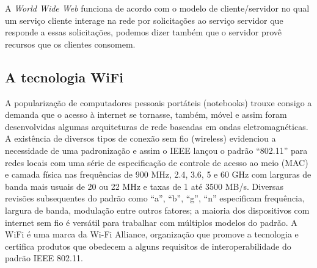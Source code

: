 A \textit{World Wide Web} funciona de acordo com o modelo de cliente/servidor no qual um serviço cliente interage na rede por solicitações ao serviço servidor que responde a essas solicitações, podemos dizer também que o servidor provê recursos que os clientes consomem.

\subsection{A tecnologia \ac{WiFi}}

A popularização de computadores pessoais portáteis (notebooks) trouxe consigo a demanda que o acesso à internet se tornasse, também, móvel e assim foram desenvolvidas algumas arquiteturas de rede baseadas em ondas eletromagnéticas. A existência de diversos tipos de conexão sem fio (wireless) evidenciou a necessidade de uma padronização e assim o \ac{IEEE} lançou o padrão “802.11” para redes locais \cite{wifi} com uma série de especificação de controle de acesso ao meio (MAC) e camada física nas frequências de 900 MHz, 2.4, 3.6, 5 e 60 GHz com larguras de banda mais usuais de 20 ou 22 MHz e taxas de 1 até 3500 MB/s. Diversas revisões subsequentes do padrão como “a”, “b”, “g”, “n” especificam frequência, largura de banda, modulação entre outros fatores; a maioria dos dispositivos com internet sem fio é versátil para trabalhar com múltiplos modelos do padrão.
A \acf{WiFi} é uma marca da Wi-Fi Alliance, organização que promove a tecnologia e certifica produtos que obedecem a alguns requisitos de interoperabilidade do padrão \ac{IEEE} 802.11.

